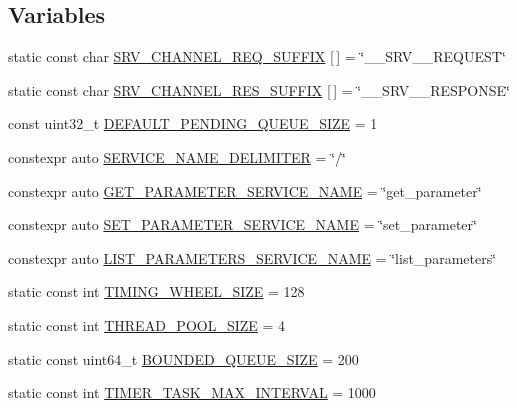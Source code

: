 \subsection*{Variables}
\begin{DoxyCompactItemize}
\item 
static const char \hyperlink{namespaceapollo_1_1cyber_a4d62d47d6a96a1b97cdbf40474b4b803}{S\-R\-V\-\_\-\-C\-H\-A\-N\-N\-E\-L\-\_\-\-R\-E\-Q\-\_\-\-S\-U\-F\-F\-I\-X} \mbox{[}$\,$\mbox{]} = \char`\"{}\-\_\-\-\_\-\-S\-R\-V\-\_\-\-\_\-\-R\-E\-Q\-U\-E\-S\-T\char`\"{}
\item 
static const char \hyperlink{namespaceapollo_1_1cyber_a9bd27ab5d5117d02d3517f948d3f3bd6}{S\-R\-V\-\_\-\-C\-H\-A\-N\-N\-E\-L\-\_\-\-R\-E\-S\-\_\-\-S\-U\-F\-F\-I\-X} \mbox{[}$\,$\mbox{]} = \char`\"{}\-\_\-\-\_\-\-S\-R\-V\-\_\-\-\_\-\-R\-E\-S\-P\-O\-N\-S\-E\char`\"{}
\item 
const uint32\-\_\-t \hyperlink{namespaceapollo_1_1cyber_a2f6db02a0b926d2d76f73ce52c149047}{D\-E\-F\-A\-U\-L\-T\-\_\-\-P\-E\-N\-D\-I\-N\-G\-\_\-\-Q\-U\-E\-U\-E\-\_\-\-S\-I\-Z\-E} = 1
\item 
constexpr auto \hyperlink{namespaceapollo_1_1cyber_ac60114c8d1710786f69ebfe7476c8301}{S\-E\-R\-V\-I\-C\-E\-\_\-\-N\-A\-M\-E\-\_\-\-D\-E\-L\-I\-M\-I\-T\-E\-R} = \char`\"{}/\char`\"{}
\item 
constexpr auto \hyperlink{namespaceapollo_1_1cyber_ace04c8ebc8ddf817366f405ae1a13bda}{G\-E\-T\-\_\-\-P\-A\-R\-A\-M\-E\-T\-E\-R\-\_\-\-S\-E\-R\-V\-I\-C\-E\-\_\-\-N\-A\-M\-E} = \char`\"{}get\-\_\-parameter\char`\"{}
\item 
constexpr auto \hyperlink{namespaceapollo_1_1cyber_a1a154dcfdc43e734bdbab4902dce0f79}{S\-E\-T\-\_\-\-P\-A\-R\-A\-M\-E\-T\-E\-R\-\_\-\-S\-E\-R\-V\-I\-C\-E\-\_\-\-N\-A\-M\-E} = \char`\"{}set\-\_\-parameter\char`\"{}
\item 
constexpr auto \hyperlink{namespaceapollo_1_1cyber_a95d12777ea6376b41c3bcdede2b70ccb}{L\-I\-S\-T\-\_\-\-P\-A\-R\-A\-M\-E\-T\-E\-R\-S\-\_\-\-S\-E\-R\-V\-I\-C\-E\-\_\-\-N\-A\-M\-E} = \char`\"{}list\-\_\-parameters\char`\"{}
\item 
static const int \hyperlink{namespaceapollo_1_1cyber_a708c544333efd71eb0b9439a18a297bf}{T\-I\-M\-I\-N\-G\-\_\-\-W\-H\-E\-E\-L\-\_\-\-S\-I\-Z\-E} = 128
\item 
static const int \hyperlink{namespaceapollo_1_1cyber_ad6cbdbe25bd25a9005ce37c68695d66b}{T\-H\-R\-E\-A\-D\-\_\-\-P\-O\-O\-L\-\_\-\-S\-I\-Z\-E} = 4
\item 
static const uint64\-\_\-t \hyperlink{namespaceapollo_1_1cyber_af9dadef03cf6b3a72c8785ea2d6e8e26}{B\-O\-U\-N\-D\-E\-D\-\_\-\-Q\-U\-E\-U\-E\-\_\-\-S\-I\-Z\-E} = 200
\item 
static const int \hyperlink{namespaceapollo_1_1cyber_a1765f3b8476f639edbcbbe53ff9e6c47}{T\-I\-M\-E\-R\-\_\-\-T\-A\-S\-K\-\_\-\-M\-A\-X\-\_\-\-I\-N\-T\-E\-R\-V\-A\-L} = 1000
\end{DoxyCompactItemize}



